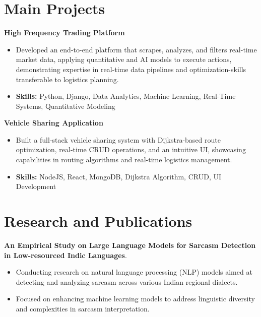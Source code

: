 \documentclass[a4paper,11pt]{article}
\begin{document}
\section{\textbf{Main Projects}}

\vspace{1mm}
  \textbf{High Frequency Trading Platform  }
\vspace{-1.5mm} %
\begin{itemize}
  \item Developed an end-to-end platform that scrapes, analyzes, and filters real-time market data, applying quantitative and AI models to execute actions, demonstrating expertise in real-time data pipelines and optimization-skills transferable to logistics planning.
\vspace{-3mm}
  \item \textbf{Skills:} Python, Django, Data Analytics, Machine Learning, Real-Time Systems, Quantitative Modeling
\end{itemize}


\vspace{1mm}
   \textbf{Vehicle Sharing Application }
\vspace{-1.5mm} %
\begin{itemize}
  \item Built a full-stack vehicle sharing system with Dijkstra-based route optimization, real-time CRUD operations, and an intuitive UI, showcasing capabilities in routing algorithms and real-time logistics management.
\vspace{-3mm}
  \item \textbf{Skills:} NodeJS, React, MongoDB, Dijkstra Algorithm, CRUD, UI Development
\end{itemize}



\section{\textbf{Research and Publications} \hfill }
\vspace{1mm}
  \textbf{An Empirical Study on Large Language Models for Sarcasm Detection in Low-resourced Indic Languages}.
\vspace{-1mm} %
\begin{itemize}
  \item Conducting research on natural language processing (NLP) models aimed at detecting and analyzing sarcasm across various Indian regional dialects.
\vspace{-3mm}
  \item Focused on enhancing machine learning models to address linguistic diversity and complexities in sarcasm interpretation.
\end{itemize}
\end{document}
